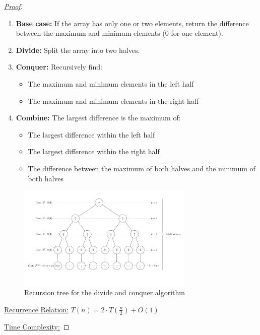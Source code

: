 \documentclass[11pt]{article}
\begin{document}
\begin{enumerate}
\begin{proof}[\underline{Proof}]
\begin{enumerate}[label=\arabic*.]
    \item \textbf{Base case:} If the array has only one or two elements, return the difference between the maximum and minimum elements (0 for one element).
    \item \textbf{Divide:} Split the array into two halves.
    \item \textbf{Conquer:} Recursively find:
    \begin{itemize}
        \item The maximum and minimum elements in the left half
        \item The maximum and minimum elements in the right half
    \end{itemize}
    \item \textbf{Combine:} The largest difference is the maximum of:
    \begin{itemize}
        \item The largest difference within the left half
        \item The largest difference within the right half  
        \item The difference between the maximum of both halves and the minimum of both halves
    \end{itemize}
\end{enumerate}

\begin{figure}[h]
\centering
\includegraphics[width=0.75\textwidth]{p4.pdf}
\caption{Recursion tree for the divide and conquer algorithm}
\end{figure}

\newpage

\underline{Recurrence Relation:} $T(n) = 2 \cdot T(\frac{n}{2}) + O(1)$

\underline{Time Complexity:}



\end{proof}
\end{enumerate}
\end{document}
